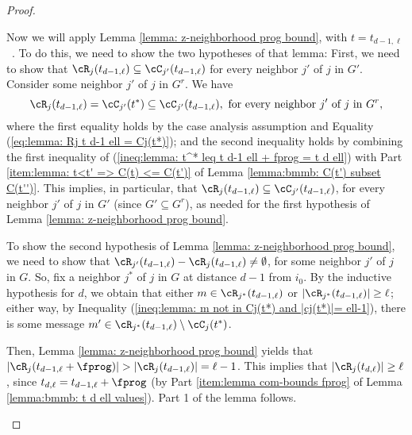 \begin{proof}
\begin{enumerate}
Now we will apply Lemma \ref{lemma: z-neighborhood prog bound}, with $t=t_{d-1,\ell}$~.
To do this, we need to show the two hypotheses of that lemma:
First, we
need to show that $\cR_j(t_{d-1,\ell}) \subseteq  \cC_{j'}(t_{d-1,\ell})$ for every neighbor $j'$ of $j$ in $G'$.
Consider some neighbor $j'$ of $j$ in $G^r$.
We have
$$\cR_{j}(t_{d-1,\ell}) = \cC_{j'}(t^*) \subseteq \cC_{j'}(t_{d-1,\ell}), \mbox{ for every neighbor } j' \mbox{ of } j \mbox{ in } G^r,$$
where the first equality holds by the case analysis assumption and Equality (\ref{eq:lemma: Rj t d-1 ell = Cj(t*)});
and the second inequality holds by combining the first inequality of
(\ref{ineq:lemma: t^* leq t d-1 ell + fprog = t d ell})
with
Part \ref{item:lemma: t<t' => C(t) <= C(t')}
of Lemma \ref{lemma:bmmb: C(t') subset C(t'')}.
This implies, in particular, that
$\cR_{j}(t_{d-1,\ell}) \subseteq \cC_{j'}(t_{d-1,\ell})$, for every neighbor $j'$ of $j$ in $G'$ (since $G' \subseteq G^r$), as needed for the first hypothesis of Lemma \ref{lemma: z-neighborhood prog bound}.


To show the second hypothesis of Lemma \ref{lemma: z-neighborhood prog bound},
we need to show that
$\cR_{j'}(t_{d-1,\ell}) - \cR_{j}(t_{d-1,\ell})\not= \emptyset$, for some neighbor $j'$ of $j$ in $G$.
So, fix a neighbor $j^*$ of $j$ in $G$ at distance $d-1$ from $i_0$.
By the inductive hypothesis for $d$,
we obtain that either $m\in \cR_{j^*}(t_{d-1,\ell})$ or $|\cR_{j^*}(t_{d-1,\ell})| \geq \ell$;
either way,
by Inequality
(\ref{ineq:lemma: m not in Cj(t*) and |cj(t*)|= ell-1}),
there is some message $m'\in \cR_{j^*}(t_{d-1,\ell}) \setminus \cC_{j}(t^*)$.




Then, Lemma \ref{lemma: z-neighborhood prog bound}
yields that $|\cR_{j}(t_{d-1,\ell}+ \fprog)| > |\cR_{j}(t_{d-1,\ell})| = \ell-1$.
This implies that $|\cR_{j}(t_{d,\ell})| \geq \ell$, since $t_{d,\ell} = t_{d-1,\ell}+\fprog$
(by Part \ref{item:lemma com-bounds fprog}
of Lemma \ref{lemma:bmmb: t d ell values}).
Part 1 of the lemma follows.





\end{enumerate}
\end{proof}
